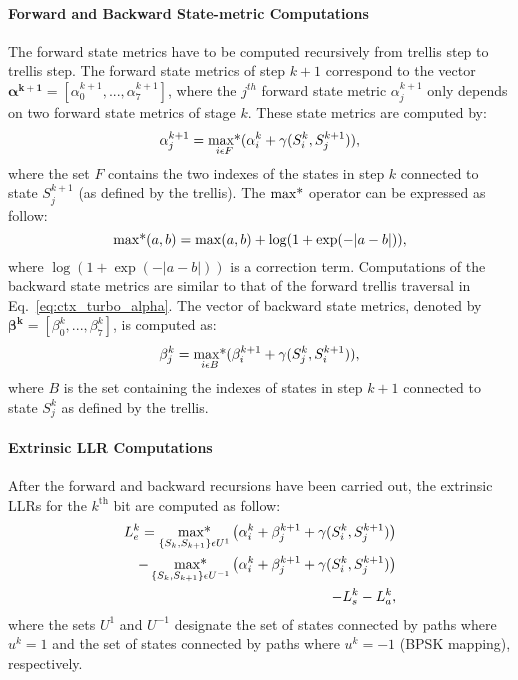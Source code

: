 \paragraph{Forward and Backward State-metric Computations}

The forward state metrics have to be computed recursively from trellis step to
trellis step. The forward state metrics of step $k+1$ correspond to the vector
$\bm{\alpha^{k+1}} = [\alpha_0^{k+1}, ... ,\alpha_7^{k+1}]$, where the
$j^{th}$ forward state metric $\alpha_j^{k+1}$ only depends on two forward
state metrics of stage $k$. These state metrics are computed by:
\begin{equation}
  \label{eq:ctx_turbo_alpha}
  \alpha_j^{k+1} =
  \operatorname*{max*}_{i \epsilon F} ( \alpha_i^k + \gamma(S_i^k, S_j^{k+1}) ),
\end{equation}
where the set $F$ contains the two indexes of the states in step $k$ connected
to state $S_j^{k+1}$ (as defined by the trellis). The $\operatorname*{max*}$ operator can be
expressed as follow:
\begin{equation}
   \operatorname*{max*}(a,b) = \max(a,b) + \log(1 + \exp(-|a-b|)),
\end{equation}
where $\log(1 + \exp(-|a-b|))$ is a correction term.
Computations of the backward state metrics are similar to that of the forward
trellis traversal in Eq.~\ref{eq:ctx_turbo_alpha}. The vector of backward state
metrics, denoted by $\bm{\beta^k} = [\beta_0^k, ..., \beta_7^k]$, is
computed as:
\begin{equation}
  \label{eq:ctx_turbo_beta}
  \beta_j^k =
  \operatorname*{max*}_{i \epsilon B} ( \beta_i^{k+1} + \gamma(S_j^k, S_i^{k+1}) ),
\end{equation}
where $B$ is the set containing the indexes of states in step $k+1$ connected to
state $S_j^k$ as defined by the trellis.

\paragraph{Extrinsic LLR Computations}

After the forward and backward recursions have been carried out, the extrinsic
LLRs for the $k^\text{th}$ bit are computed as follow:
\begin{equation}
  \label{eq:ctx_turbo_ext}
  \begin{aligned}
  L_e^k = \operatorname*{max*}_{\{S_k, S_{k+1}\}\epsilon U^1}\big( \alpha_i^k + \beta_j^{k+1} +
  \gamma(S_i^k, S_j^{k+1}) \big) \\
  - \operatorname*{max*}_{\{S_k, S_{k+1}\}\epsilon U^{-1}}\big( \alpha_i^k + \beta_j^{k+1} +
  \gamma(S_i^k, S_j^{k+1}) \big) \\
  - L_{s}^k - L_a^k,
  \end{aligned}
\end{equation}
where the sets $U^1$ and $U^{-1}$ designate the set of states connected by paths
where $u^k=1$ and the set of states connected by paths where $u^k=-1$ (BPSK
mapping), respectively.

